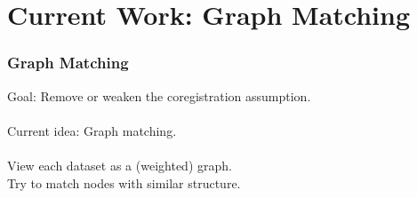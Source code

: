 \documentclass{beamer}
\begin{document}
\section{Current Work: Graph Matching}
\begin{frame}
  \frametitle{Graph Matching}
  Goal: Remove or weaken the coregistration assumption.\\~\\
  Current idea: Graph matching. \\~\\
  View each dataset as a (weighted) graph.\\
  Try to match nodes with similar structure.
\end{frame}


\end{document}
